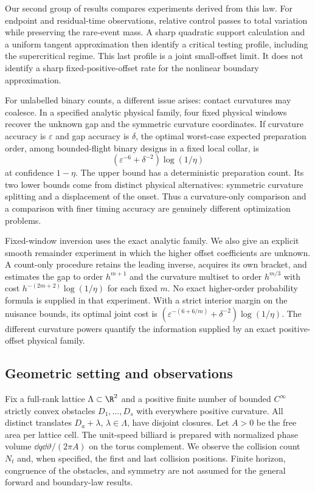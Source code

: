 Our second group of results compares experiments derived from this law.
For endpoint and residual-time observations, relative control passes to
total variation while preserving the rare-event mass. A sharp quadratic
support calculation and a uniform tangent approximation then identify a
critical testing profile, including the supercritical regime. This last
profile is a joint small-offset limit. It does not identify a sharp
fixed-positive-offset rate for the nonlinear boundary approximation.

For unlabelled binary counts, a different issue arises: contact
curvatures may coalesce. In a specified analytic physical family, four
fixed physical windows recover the unknown gap and the symmetric
curvature coordinates. If curvature accuracy is $\varepsilon$ and gap
accuracy is $\delta$, the optimal worst-case expected preparation order,
among bounded-flight binary designs in a fixed local collar, is
\[
                (\varepsilon^{-6}+\delta^{-2})\log(1/\eta)
\]
at confidence $1-\eta$. The upper bound has a deterministic preparation
count. Its two lower bounds come from distinct physical alternatives:
symmetric curvature splitting and a displacement of the onset. Thus a
curvature-only comparison and a comparison with finer timing accuracy
are genuinely different optimization problems.

Fixed-window inversion uses the exact analytic family. We also give an
explicit smooth remainder experiment in which the higher offset
coefficients are unknown. A count-only procedure retains the leading
inverse, acquires its own bracket, and estimates the gap to order
$h^{m+1}$ and the curvature multiset to order $h^{m/3}$ with cost
$h^{-(2m+2)}\log(1/\eta)$ for each fixed $m$. No exact higher-order
probability formula is supplied in that experiment. With a strict
interior margin on the nuisance bounds, its optimal joint cost is
$(\varepsilon^{-(6+6/m)}+\delta^{-2})\log(1/\eta)$.
The different curvature powers quantify the information supplied by
an exact positive-offset physical family.
\subsection{Geometric setting and observations}
Fix a full-rank lattice $\Lambda\subset\R^2$ and a positive finite number of bounded
$C^\infty$ strictly convex obstacles $D_1,\ldots,D_s$ with everywhere
positive curvature. All distinct translates $D_a+\lambda$, $\lambda\in
\Lambda$, have disjoint closures. Let $A>0$ be the free area per lattice
cell. The unit-speed billiard is prepared with normalized phase volume
$\dd q\dd\vartheta/(2\pi A)$ on the torus complement. We observe the
collision count $N_t$ and, when specified, the first and last collision
positions. Finite horizon, congruence of the obstacles, and symmetry
are not assumed for the general forward and boundary-law results.

